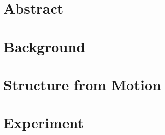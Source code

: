 \documentclass[11pt]{report}
\begin{document}
    

    \newpage
    \tableofcontents

    \newpage
    \chapter{Abstract}
    

    \newpage
    \chapter{Background}
    

    \newpage
    \chapter{Structure from Motion}
    

    \newpage
    \chapter{Experiment}
    

    
    
    
\end{document}
